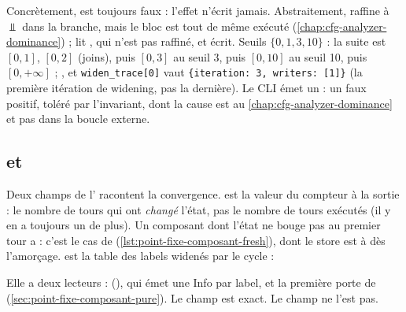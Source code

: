 \begin{sloppypar}
Concrètement,  est toujours faux : l'effet n'écrit jamais.
Abstraitement,  raffine  à $\Bot$ dans la
branche, mais le bloc est tout de même exécuté
(\cref{chap:cfg-analyzer-dominance}) ;  lit ,
qui n'est pas raffiné, et écrit. Seuils $\{0, 1, 3, 10\}$ : la suite est
$[0,1]$, $[0,2]$ (joins), puis $[0,3]$ au seuil 3, puis $[0,10]$ au seuil 10,
puis $[0,+\infty]$ ; , et \texttt{widen\_trace[0]} vaut
\texttt{\{iteration: 3, writers: [1]\}} (la première itération de widening,
pas la dernière). Le CLI émet un \Warning{}  : un faux
positif, toléré par l'invariant, dont la cause est au
\cref{chap:cfg-analyzer-dominance} et pas dans la boucle externe.
\end{sloppypar}

\subsection{ et }
\label{sec:point-fixe-composant-widen-trace}

Deux champs de l' racontent la convergence.
 est la valeur du compteur à la sortie : le nombre de tours
qui ont \emph{changé} l'état, pas le nombre de tours exécutés (il y en a
toujours un de plus). Un composant dont l'état ne bouge pas au premier tour
a  : c'est le cas de 
(\cref{lst:point-fixe-composant-fresh}), dont le store est à
 dès l'amorçage.  est la table des labels
widenés par le cycle :


Elle a deux lecteurs : 
(), qui émet une Info par
label, et la première porte de 
(\cref{sec:point-fixe-composant-pure}). Le champ  est exact.
Le champ  ne l'est pas.

